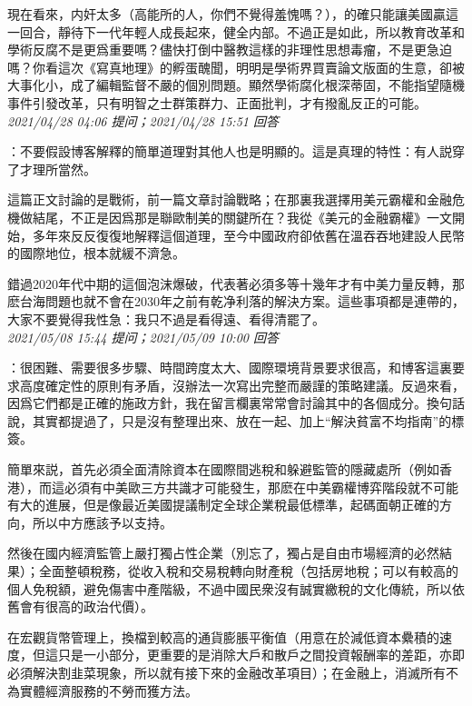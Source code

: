 \documentclass[twocolumn]{ctexart}
\begin{document}
現在看來，内奸太多（高能所的人，你們不覺得羞愧嗎？），的確只能讓美國贏這一回合，靜待下一代年輕人成長起來，健全内部。不過正是如此，所以教育改革和學術反腐不是更爲重要嗎？儘快打倒中醫教這樣的非理性思想毒瘤，不是更急迫嗎？你看這次《寫真地理》的孵蛋醜聞，明明是學術界買賣論文版面的生意，卻被大事化小，成了編輯監督不嚴的個別問題。顯然學術腐化根深蒂固，不能指望隨機事件引發改革，只有明智之士群策群力、正面批判，才有撥亂反正的可能。
\\

\textit{\hfill\noindent\small 2021/04/28 04:06 提问；2021/04/28 15:51 回答}

：不要假設博客解釋的簡單道理對其他人也是明顯的。這是真理的特性：有人説穿了才理所當然。

這篇正文討論的是戰術，前一篇文章討論戰略；在那裏我選擇用美元霸權和金融危機做結尾，不正是因爲那是聯歐制美的關鍵所在？我從《美元的金融霸權》一文開始，多年來反反復復地解釋這個道理，至今中國政府卻依舊在溫吞吞地建設人民幣的國際地位，根本就緩不濟急。

錯過2020年代中期的這個泡沫爆破，代表著必須多等十幾年才有中美力量反轉，那麽台海問題也就不會在2030年之前有乾净利落的解決方案。這些事項都是連帶的，大家不要覺得我性急：我只不過是看得遠、看得清罷了。
\\

\textit{\hfill\noindent\small 2021/05/08 15:44 提问；2021/05/09 10:00 回答}

：很困難、需要很多步驟、時間跨度太大、國際環境背景要求很高，和博客這裏要求高度確定性的原則有矛盾，沒辦法一次寫出完整而嚴謹的策略建議。反過來看，因爲它們都是正確的施政方針，我在留言欄裏常常會討論其中的各個成分。換句話說，其實都提過了，只是沒有整理出來、放在一起、加上“解決貧富不均指南”的標簽。

簡單來説，首先必須全面清除資本在國際間逃稅和躲避監管的隱藏處所（例如香港），而這必須有中美歐三方共識才可能發生，那麽在中美霸權博弈階段就不可能有大的進展，但是像最近美國提議制定全球企業稅最低標準，起碼面朝正確的方向，所以中方應該予以支持。

然後在國内經濟監管上嚴打獨占性企業（別忘了，獨占是自由市場經濟的必然結果）；全面整頓稅務，從收入稅和交易稅轉向財產稅（包括房地稅；可以有較高的個人免稅額，避免傷害中產階級，不過中國民衆沒有誠實繳稅的文化傳統，所以依舊會有很高的政治代價）。

在宏觀貨幣管理上，換檔到較高的通貨膨脹平衡值（用意在於減低資本纍積的速度，但這只是一小部分，更重要的是消除大戶和散戶之間投資報酬率的差距，亦即必須解決割韭菜現象，所以就有接下來的金融改革項目）；在金融上，消滅所有不為實體經濟服務的不勞而獲方法。
\end{document}
